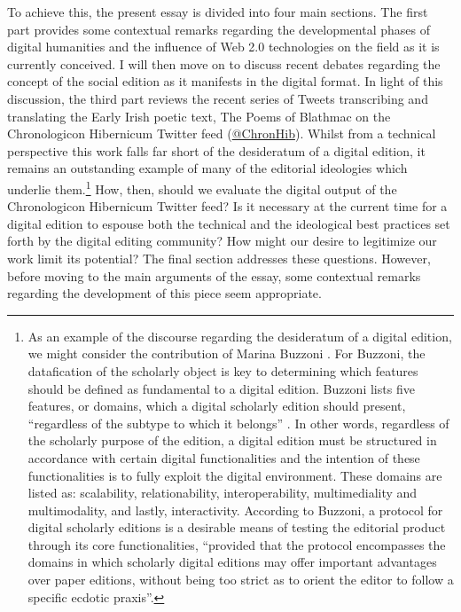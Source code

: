 \begin{paper}
To achieve this, the present essay is divided into four main sections. The first part provides some contextual remarks regarding the developmental phases of digital humanities and the influence of Web 2.0 technologies on the field as it is currently conceived. I will then move on to discuss recent debates regarding the concept of the social edition as it manifests in the digital format. In light of this discussion, the third part reviews the recent series of Tweets transcribing and translating the Early Irish poetic text, The Poems of Blathmac on the Chronologicon Hibernicum Twitter feed (\href{https://twitter.com/chronhib}{@ChronHib}). Whilst from a technical perspective this work falls far short of the desideratum of a digital edition, it remains an outstanding example of many of the editorial ideologies which underlie them.\footnote{As an example of the discourse regarding the desideratum of a digital edition, we might consider the contribution of Marina Buzzoni \citeyear{buzzoni_protocol_2016}. For Buzzoni, the datafication of the scholarly object is key to determining which features should be defined as fundamental to a digital edition. Buzzoni lists five features, or domains, which a digital scholarly edition should present, ``regardless of the subtype to which it belongs'' \citep[61]{buzzoni_protocol_2016}. In other words, regardless of the scholarly purpose of the edition, a digital edition must be structured in accordance with certain digital functionalities and the intention of these functionalities is to fully exploit the digital environment. These domains are listed as: scalability, relationability, interoperability, multimediality and multimodality, and lastly, interactivity. According to Buzzoni, a protocol for digital scholarly editions is a desirable means of testing the editorial product through its core functionalities, ``provided that the protocol encompasses the domains in which scholarly digital editions may offer important advantages over paper editions, without being too strict as to orient the editor to follow a specific ecdotic praxis''\citep[81]{buzzoni_protocol_2016}.} How, then, should we evaluate the digital output of the Chronologicon Hibernicum Twitter feed? Is it necessary at the current time for a digital edition to espouse both the technical and the ideological best practices set forth by the digital editing community? How might our desire to legitimize our work limit its potential? The final section addresses these questions. However, before moving to the main arguments of the essay, some contextual remarks regarding the development of this piece seem appropriate.


\end{paper}
